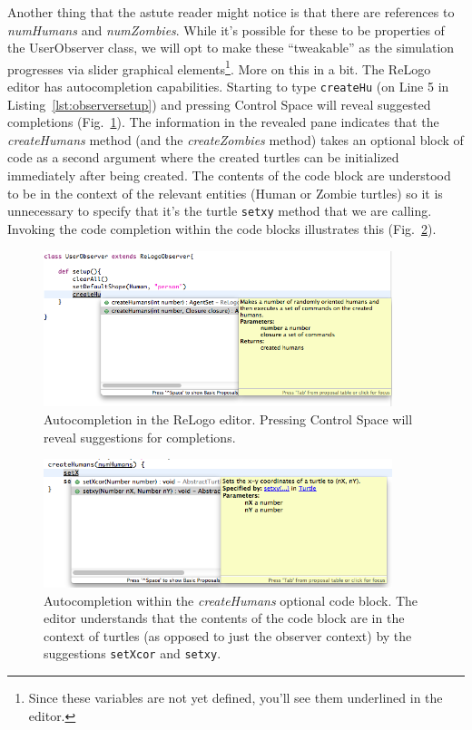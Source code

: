 \documentclass[11pt]{amsart}
\begin{document}
Another thing that the astute reader might notice is that there are references to \emph{numHumans} and \emph{numZombies}. While it's possible for these to be properties of the UserObserver class, we will opt to make these ``tweakable'' as the simulation progresses via slider graphical elements\footnote{Since these variables are not yet defined, you'll see them underlined in the editor.}. More on this in a bit. The ReLogo editor has autocompletion capabilities. Starting to type \texttt{createHu} (on Line 5 in Listing~\ref{lst:observersetup}) and pressing Control Space will reveal suggested completions (Fig.~\ref{fig:createHu}). The information in the revealed pane indicates that the \emph{createHumans} method (and the \emph{createZombies} method) takes an optional block of code as a second argument where the created turtles can be initialized immediately after being created. The contents of the code block are understood to be in the context of the relevant entities (Human or Zombie turtles) so it is unnecessary to specify that it's the turtle \texttt{setxy} method that we are calling. Invoking the code completion within the code blocks illustrates this (Fig.~\ref{fig:setX}).

\begin{figure}
\begin{center}
\vspace{.2in}
\centerline {
\includegraphics[width=4in]{GettingStartedImages/CreateHu.png}
}
\caption{Autocompletion in the ReLogo editor. Pressing Control Space will reveal suggestions for completions.}
\label{fig:createHu}
\end{center}
\end{figure}

\begin{figure}
\begin{center}
\vspace{.2in}
\centerline {
\includegraphics[width=4in]{GettingStartedImages/SetX.png}
}
\caption{Autocompletion within the \emph{createHumans} optional code block. The editor understands that the contents of the code block are in the context of turtles (as opposed to just the observer context) by the suggestions \texttt{setXcor} and \texttt{setxy}.}
\label{fig:setX}
\end{center}
\end{figure}
\end{document}
